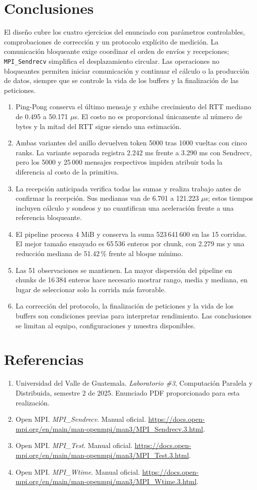 \documentclass[11pt,letterpaper]{article}
\newcommand{\heading}[1]{\section{\textcolor{azul}{#1}}}
\begin{document}
\clearpage
\heading{Conclusiones}

El diseño cubre los cuatro ejercicios del enunciado con parámetros
controlables, comprobaciones de corrección y un protocolo explícito de
medición. La comunicación bloqueante exige coordinar el orden de envíos y
recepciones; \texttt{MPI\_Sendrecv} simplifica el desplazamiento circular.
Las operaciones no bloqueantes permiten iniciar comunicación y continuar
el cálculo o la producción de datos, siempre que se controle la vida de
los buffers y la finalización de las peticiones.

\begin{enumerate}
\item Ping-Pong conserva el último mensaje y exhibe crecimiento del RTT
mediano de 0.495 a 50.171 $\mu$s. El costo no es proporcional únicamente
al número de bytes y la mitad del RTT sigue siendo una estimación.
\item Ambas variantes del anillo devuelven token 5000 tras 1000 vueltas
con cinco ranks. La variante separada registra 2.242 ms frente a 3.290 ms
con Sendrecv, pero los 5000 y 25\,000 mensajes respectivos impiden
atribuir toda la diferencia al costo de la primitiva.
\item La recepción anticipada verifica todas las sumas y realiza trabajo
antes de confirmar la recepción. Sus medianas van de 6.701 a 121.223
$\mu$s; estos tiempos incluyen cálculo y sondeos y no cuantifican una
aceleración frente a una referencia bloqueante.
\item El pipeline procesa 4 MiB y conserva la suma 523\,641\,600 en
las 15 corridas. El mejor tamaño ensayado es 65\,536 enteros por chunk,
con 2.279 ms y una reducción mediana de 51.42\,\% frente al bloque mínimo.
\item Las 51 observaciones se mantienen. La mayor dispersión del pipeline
en chunks de 16\,384 enteros hace necesario mostrar rango, media y
mediana, en lugar de seleccionar solo la corrida más favorable.
\item La corrección del protocolo, la finalización de peticiones y la
vida de los buffers son condiciones previas para interpretar rendimiento.
Las conclusiones se limitan al equipo, configuraciones y muestra disponibles.
\end{enumerate}

\clearpage
\heading{Referencias}

\begin{enumerate}
\raggedright
\item Universidad del Valle de Guatemala. \emph{Laboratorio \#3},
Computación Paralela y Distribuida, semestre 2 de 2025. Enunciado PDF
proporcionado para esta realización.
\item Open MPI. \emph{MPI\_Sendrecv}. Manual oficial.
\url{https://docs.open-mpi.org/en/main/man-openmpi/man3/MPI_Sendrecv.3.html}.
\item Open MPI. \emph{MPI\_Test}. Manual oficial.
\url{https://docs.open-mpi.org/en/main/man-openmpi/man3/MPI_Test.3.html}.
\item Open MPI. \emph{MPI\_Wtime}. Manual oficial.
\url{https://docs.open-mpi.org/en/main/man-openmpi/man3/MPI_Wtime.3.html}.
\end{enumerate}
\end{document}
